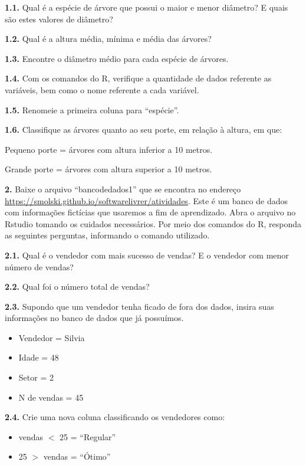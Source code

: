 \documentclass[12pt,brazil,oneside]{book}
\begin{document}
\textbf{1.1.} Qual é a espécie de árvore que possui o maior e menor
diâmetro? E quais são estes valores de diâmetro?

\textbf{1.2.} Qual é a altura média, mínima e média das árvores?

\textbf{1.3.} Encontre o diâmetro médio para cada espécie de árvores.

\textbf{1.4.} Com os comandos do R, verifique a quantidade de dados
referente as variáveis, bem como o nome referente a cada variável.

\textbf{1.5.} Renomeie a primeira coluna para ``espécie''.

\textbf{1.6.} Classifique as árvores quanto ao seu porte, em relação à
altura, em que:

Pequeno porte = árvores com altura inferior a 10 metros.

Grande porte = árvores com altura superior a 10 metros.

\textbf{2.} Baixe o arquivo ``bancodedados1'' que se encontra no
endereço \url{https://smolski.github.io/softwarelivrer/atividades}. Este
é um banco de dados com informações fictícias que usaremos a fim de
aprendizado. Abra o arquivo no Rstudio tomando os cuidados necessários.
Por meio dos comandos do R, responda as seguintes perguntas, informando
o comando utilizado.

\textbf{2.1.} Qual é o vendedor com mais sucesso de vendas? E o vendedor
com menor número de vendas?

\textbf{2.2.} Qual foi o número total de vendas?

\textbf{2.3.} Supondo que um vendedor tenha ficado de fora dos dados,
insira suas informações no banco de dados que já possuímos.

\begin{itemize}
\item
  Vendedor = Silvia
\item
  Idade = 48
\item
  Setor = 2
\item
  N de vendas = 45
\end{itemize}

\textbf{2.4.} Crie uma nova coluna classificando os vendedores como:

\begin{itemize}
\item
  vendas \(<\) 25 = ``Regular''
\item
  25 \(>\) vendas = ``Ótimo''
\end{itemize}
\end{document}
